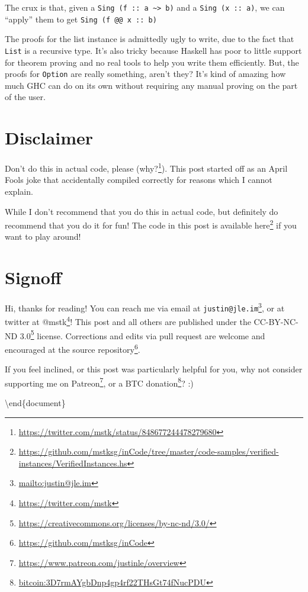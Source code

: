 \documentclass[]{article}
\renewcommand{\href}[2]{#2\footnote{\url{#1}}}
\begin{document}
The crux is that, given a
\texttt{Sing\ (f\ ::\ a\ \textasciitilde{}\textgreater{}\ b)} and a
\texttt{Sing\ (x\ ::\ a)}, we can ``apply'' them to get
\texttt{Sing\ (f\ @@\ x\ ::\ b)}

The proofs for the list instance is admittedly ugly to write, due to the fact
that \texttt{List} is a recursive type. It's also tricky because Haskell has
poor to little support for theorem proving and no real tools to help you write
them efficiently. But, the proofs for \texttt{Option} are really something,
aren't they? It's kind of amazing how much GHC can do on its own without
requiring any manual proving on the part of the user.

\section{Disclaimer}\label{disclaimer}

Don't do this in actual code, please
(\href{https://twitter.com/mstk/status/848677244478279680}{why?}). This post
started off as an April Fools joke that accidentally compiled correctly for
reasons which I cannot explain.

While I don't recommend that you do this in actual code, but definitely do
recommend that you do it for fun! The code in this post is available
\href{https://github.com/mstksg/inCode/tree/master/code-samples/verified-instances/VerifiedInstances.hs}{here}
if you want to play around!

\section{Signoff}\label{signoff}

Hi, thanks for reading! You can reach me via email at
\href{mailto:justin@jle.im}{\nolinkurl{justin@jle.im}}, or at twitter at
\href{https://twitter.com/mstk}{@mstk}! This post and all others are published
under the \href{https://creativecommons.org/licenses/by-nc-nd/3.0/}{CC-BY-NC-ND
3.0} license. Corrections and edits via pull request are welcome and encouraged
at \href{https://github.com/mstksg/inCode}{the source repository}.

If you feel inclined, or this post was particularly helpful for you, why not
consider \href{https://www.patreon.com/justinle/overview}{supporting me on
Patreon}, or a \href{bitcoin:3D7rmAYgbDnp4gp4rf22THsGt74fNucPDU}{BTC donation}?
:)

\textbackslash end\{document\}
\end{document}
